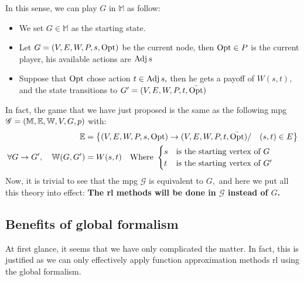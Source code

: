 	In this sense, we can play $G$ in $\mathbb{M}$ as follow:
	\begin{itemize}
		\item We set $G\in \mathbb{M}$ as the starting state.
		\item Let $G=(V,E,W,P,s,\operatorname{Opt})$ be the current node, then $\operatorname{Opt}\in P$ is the current player, his available actions are $\operatorname{Adj} s$
		\item Suppose that $\operatorname{Opt}$ chose action $t\in \operatorname{Adj} s,$ then he gets a payoff of $W(s,t),$ and the state transitions to $G'=(V,E,W,P,t,\bar{\operatorname{Opt}})$
	\end{itemize}
	In fact, the game that we have just proposed is the same as the following \acrshort{mpg} $\mathscr{G}=(\mathbb{M},\mathbb{E},\mathbb{W},V,G,p)$ with:
	\begin{align*}
		\mathbb{E}&=\left\{(V,E,W,P,s,\operatorname{Opt})\rightarrow (V,E,W,P,t,\bar{\operatorname{Opt}})/\quad (s,t) \in E\right\} \\
		\forall G\rightarrow G',\quad \mathbb{W}(G,G')&=W(s,t) \quad \text{Where} \ \begin{cases}
			s & \text{is the starting vertex of} \ G \\
			t & \text{is the starting vertex of} \ G'
		\end{cases} 
	\end{align*} 
	Now, it is trivial to see that the \acrshort{mpg} $\mathscr{G}$ is equivalent to $G,$ and here we put all this theory into effect: \textbf{The \acrshort{rl} methods will be done in $\mathscr{G}$ instead of $G$.}
	
	\subsection{Benefits of global formalism}
	At first glance, it seems that we have only complicated the matter. In fact, this is justified as we can only effectively apply function approximation methods \acrshort{rl} using the global formalism.
	
